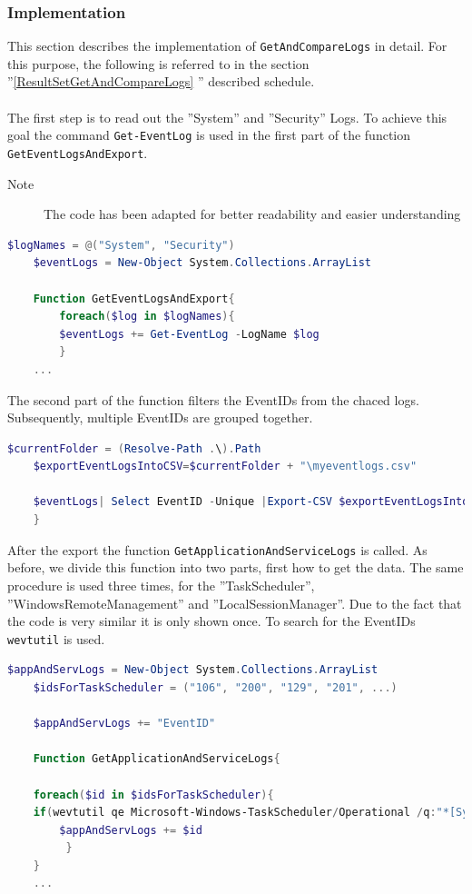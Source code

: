 \subsubsection{Implementation}
This section describes the implementation of \lstinline|GetAndCompareLogs| in detail. For this purpose, the following is referred to in the section ''\ref{ResultSetGetAndCompareLogs} '' described schedule.
\\\\
The first step is to read out the ''System'' and ''Security'' Logs. To achieve this goal the command \lstinline|Get-EventLog| is used in the first part of the function \lstinline|GetEventLogsAndExport|. \begin{description}
    \item[Note] The code has been adapted for better readability and easier understanding
    \end{description}
\begin{lstlisting}[caption=Function GetEventLogsAndExport Part 1, language=PowerShell]
    $logNames = @("System", "Security")
    $eventLogs = New-Object System.Collections.ArrayList

    Function GetEventLogsAndExport{
        foreach($log in $logNames){
        $eventLogs += Get-EventLog -LogName $log
        }
    ...
\end{lstlisting}
The second part of the function filters the EventIDs from the chaced logs. Subsequently, multiple EventIDs are grouped together.
\begin{lstlisting}[caption=Function GetEventLogsAndExport Part 2, language=PowerShell]
    $currentFolder = (Resolve-Path .\).Path
    $exportEventLogsIntoCSV=$currentFolder + "\myeventlogs.csv"

    $eventLogs| Select EventID -Unique |Export-CSV $exportEventLogsIntoCSV -NoTypeInfo -Encoding UTF8
    }
\end{lstlisting}
After the export the function \lstinline|GetApplicationAndServiceLogs| is called. As before, we divide this function into two parts, first how to get the data. The same procedure is used three times, for the ''TaskScheduler'', ''WindowsRemoteManagement'' and ''LocalSessionManager''. Due to the fact that the code is very similar it is only shown once. To search for the EventIDs  \lstinline|wevtutil| is used.
\begin{lstlisting}[caption=Function GetApplicationAndServiceLogs Part 1, language=PowerShell]
    $appAndServLogs = New-Object System.Collections.ArrayList
    $idsForTaskScheduler = ("106", "200", "129", "201", ...)

    $appAndServLogs += "EventID"

    Function GetApplicationAndServiceLogs{
    
    foreach($id in $idsForTaskScheduler){
    if(wevtutil qe Microsoft-Windows-TaskScheduler/Operational /q:"*[System[(EventID="$id" )]]" /uni:false /f:text){
        $appAndServLogs += $id
         }
    }
    ...
\end{lstlisting}
